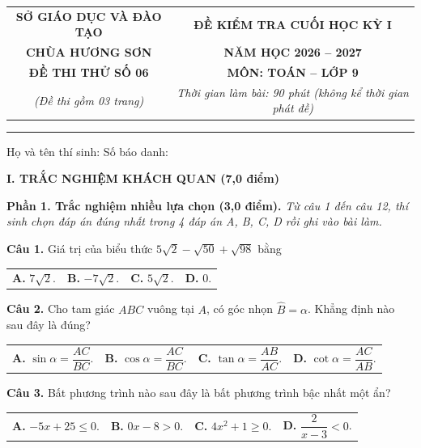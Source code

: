 \documentclass[11pt,a4paper]{article}
\begin{document}
\noindent
\begin{tabular*}{\linewidth}{@{\extracolsep{\fill}}cc@{}}
\textbf{SỞ GIÁO DỤC VÀ ĐÀO TẠO} & \textbf{ĐỀ KIỂM TRA CUỐI HỌC KỲ I} \\
\textbf{CHÙA HƯƠNG SƠN} & \textbf{NĂM HỌC 2026 -- 2027} \\
\textbf{ĐỀ THI THỬ SỐ 06} & \textbf{MÔN: TOÁN -- LỚP 9} \\
\textit{(Đề thi gồm 03 trang)} & \textit{Thời gian làm bài: 90 phút (không kể thời gian phát đề)} \\
\end{tabular*}

\vspace{2mm}
\noindent
\rule{\linewidth}{0.8pt}

\vspace{1mm}
\noindent
Họ và tên thí sinh: \dotfill Số báo danh: \dotfill

\vspace{2mm}
\noindent
\textbf{\large I. TRẮC NGHIỆM KHÁCH QUAN (7,0 điểm)}

\vspace{1mm}
\noindent
\textbf{Phần 1. Trắc nghiệm nhiều lựa chọn (3,0 điểm).} \textit{Từ câu 1 đến câu 12, thí sinh chọn đáp án đúng nhất trong 4 đáp án A, B, C, D rồi ghi vào bài làm.}

\vspace{1.5mm}
\textbf{Câu 1.} Giá trị của biểu thức $5\sqrt{2} - \sqrt{50} + \sqrt{98}$ bằng\\
\begin{tabularx}{\linewidth}{XXXX}
\textbf{A.} $7\sqrt{2}$. & \textbf{B.} $-7\sqrt{2}$. & \textbf{C.} $5\sqrt{2}$. & \textbf{D.} $0$.
\end{tabularx}

\vspace{1.5mm}
\textbf{Câu 2.} Cho tam giác $ABC$ vuông tại $A$, có góc nhọn $\widehat{B} = \alpha$. Khẳng định nào sau đây là đúng?\\
\begin{tabularx}{\linewidth}{XXXX}
\textbf{A.} $\sin \alpha = \dfrac{AC}{BC}$. & \textbf{B.} $\cos \alpha = \dfrac{AC}{BC}$. & \textbf{C.} $\tan \alpha = \dfrac{AB}{AC}$. & \textbf{D.} $\cot \alpha = \dfrac{AC}{AB}$.
\end{tabularx}

\vspace{1.5mm}
\textbf{Câu 3.} Bất phương trình nào sau đây là bất phương trình bậc nhất một ẩn?\\
\begin{tabularx}{\linewidth}{XXXX}
\textbf{A.} $-5x + 25 \le 0$. & \textbf{B.} $0x - 8 > 0$. & \textbf{C.} $4x^2 + 1 \ge 0$. & \textbf{D.} $\dfrac{2}{x-3} < 0$.
\end{tabularx}
\end{document}
